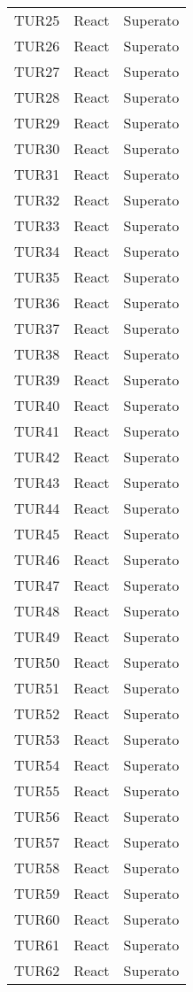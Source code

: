 \documentclass[PianoDiQualifica.tex]{subfiles}
\begin{document}
\begin{longtable}[H]{P{2cm}P{8.5cm}P{3cm}}
	TUR25 & React & Superato \\ 
	TUR26 & React & Superato \\ 
	TUR27 & React & Superato \\ 
	TUR28 & React & Superato \\ 
	TUR29 & React & Superato \\ 
	TUR30 & React & Superato \\ 
	TUR31 & React & Superato \\ 
	TUR32 & React & Superato \\ 
	TUR33 & React & Superato \\ 
	TUR34 & React & Superato \\ 
	TUR35 & React & Superato \\ 
	TUR36 & React & Superato \\ 
	TUR37 & React & Superato \\ 
	TUR38 & React & Superato \\ 
	TUR39 & React & Superato \\ 
	TUR40 & React & Superato \\ 
	TUR41 & React & Superato \\ 
	TUR42 & React & Superato \\ 
	TUR43 & React & Superato \\ 
	TUR44 & React & Superato \\ 
	TUR45 & React & Superato \\ 
	TUR46 & React & Superato \\ 
	TUR47 & React & Superato \\ 
	TUR48 & React & Superato \\ 
	TUR49 & React & Superato \\ 
	TUR50 & React & Superato \\ 
	TUR51 & React & Superato \\ 
	TUR52 & React & Superato \\ 
	TUR53 & React & Superato \\ 
	TUR54 & React & Superato \\ 
	TUR55 & React & Superato \\ 
	TUR56 & React & Superato \\ 
	TUR57 & React & Superato \\ 
	TUR58 & React & Superato \\ 
	TUR59 & React & Superato \\ 
	TUR60 & React & Superato \\ 
	TUR61 & React & Superato \\ 
	TUR62 & React & Superato \\ 

\end{longtable}
\end{document}
